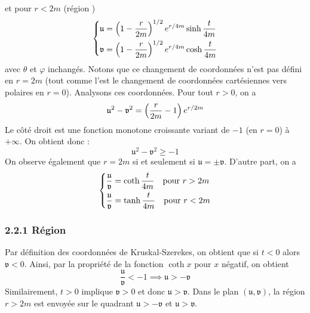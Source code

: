 et pour $r<2m$ (région )
\begin{align}
    \label{coordonnées KS 2}
    \begin{dcases}
        \mathfrak{u} = \left( 1 - \frac{r}{2m} \right)^{1/2} e^{r/4m} \sinh \frac{t}{4m}\\
        \mathfrak{v} = \left( 1 - \frac{r}{2m}\right)^{1/2} e^{r/4m} \cosh \frac{t}{4m}
    \end{dcases}
\end{align}
avec $\theta$ et $\varphi$ inchangés. Notons que ce changement de coordonnées n'est pas défini en $r=2m$ (tout comme l'est le changement de coordonnées cartésiennes vers polaires en $r=0$). Analysons ces coordonnées. Pour tout $r>0$, on a
\begin{equation}
    \label{coordonnées KS 3}
    \mathfrak{u}^2 - \mathfrak{v}^2 = \left( \frac{r}{2m} - 1 \right) e^{r/2m}
\end{equation}
Le côté droit est une fonction monotone croissante variant de $-1$ (en $r=0$) à $+\infty$. On obtient donc :
\begin{equation}
    \boxed{\mathfrak{u}^2 -\mathfrak{v}^2 \geq -1}
\end{equation}
On observe également que $r=2m$ si et seulement si $\mathfrak{u} = \pm \mathfrak{v}$. D'autre part, on a 
\begin{equation}
    \label{coordonnées KS 4}
    \begin{dcases}
        \frac{\mathfrak{u}}{\mathfrak{v}} = \coth \frac{t}{4m} \quad \text{pour } r>2m \\
        \frac{\mathfrak{u}}{\mathfrak{v}} = \tanh \frac{t}{4m} \quad \text{pour } r<2m
    \end{dcases}
\end{equation}
\subsubsection{2.2.1 Région }
Par définition des coordonnées de Kruskal-Szerekes, on obtient que si $t<0$ alors $\mathfrak{v}<0$. Ainsi, par la propriété de la fonction $\coth x$ pour $x$ négatif, on obtient
\begin{equation}
    \frac{\mathfrak{u}}{\mathfrak{v}} < -1 \implies \mathfrak{u} > - \mathfrak{v}
\end{equation}
Similairement, $t>0$ implique $\mathfrak{v}>0$ et donc $\mathfrak{u}>\mathfrak{v}$. Dans le plan $(\mathfrak{u},\mathfrak{v})$, la région $r>2m$ est envoyée sur le quadrant $\mathfrak{u} > - \mathfrak{v}$ et $\mathfrak{u} > \mathfrak{v}$.

